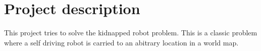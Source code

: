 \chapter{Project description}
\label{chp:sysdes}

This project tries to solve the kidnapped robot problem. This is a classic problem where a self driving robot is carried to an abitrary location in a world map.